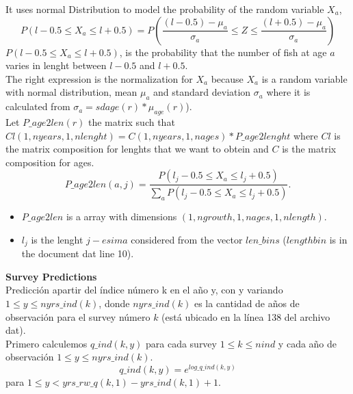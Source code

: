 \documentclass{article}
\begin{document}
It uses normal Distribution to model the probability of the random variable $X_a$, 
\begin{equation}
    P(l-0.5\leq X_a\leq l+0.5 ) = P\left(\dfrac{(l-0.5)-\mu_a}{\sigma_a}\leq Z\leq\dfrac{(l+0.5)-\mu_a}{\sigma_a}\right)
\end{equation}
$P(l-0.5\leq X_a\leq l+0.5 )$, is the probability that the number of fish at age $a$ varies in lenght between  $l-0.5$ and $l+0.5$. \\
The right expression is the normalization for $X_a$ because $X_a$ is a random variable with normal distribution, mean $\mu_a$ and  standard deviation $\sigma_a$ where it is calculated from $\sigma_{a}=sdage(r)*\mu_{age}(r)$).\\
Let $P\_age2len(r)$ the matrix such that $Cl(1,nyears,1,nlenght)=C(1,nyears,1,nages)*P\_age2lenght$ where $Cl$ is the matrix composition for lenghts that we want to obtein and $C$ is the matrix composition for ages.
\begin{equation}
    P\_age2len(a,j) = \dfrac{P(l_j-0.5\leq X_a\leq l_j+0.5 )}{\sum_{a}P(l_j-0.5\leq X_a\leq l_j+0.5 )}.
\end{equation}

\begin{itemize}
    \item $P\_age2len$ is a array with dimensions  $(1,ngrowth,1,nages,1,nlength)$.
\end{itemize}
\begin{itemize}
    \item $l_j$ is the lenght $j-esima$ considered from the vector $len\_bins$ ($lengthbin$ is in the document dat line 10).
\end{itemize}

\textbf{Survey Predictions}\\
Predicción apartir del índice número k en el año y, con y variando $1\leq y \leq nyrs\_ind(k)$, donde $nyrs\_ind(k)$ es la cantidad de años de observación  para el survey número $k$ (está ubicado en la línea 138 del archivo dat).\\
Primero calculemos $q\_ind(k,y)$ para cada survey $1\leq k \leq nind$ y cada año de observación $1\leq y \leq nyrs\_ind(k)$.
\begin{equation}
    q\_ind(k,y)=e^{log\_q\_ind(k,y)}
\end{equation}
para $1\leq y < yrs\_rw\_q(k,1)-yrs\_ind(k,1)+1$.\\
\end{document}
